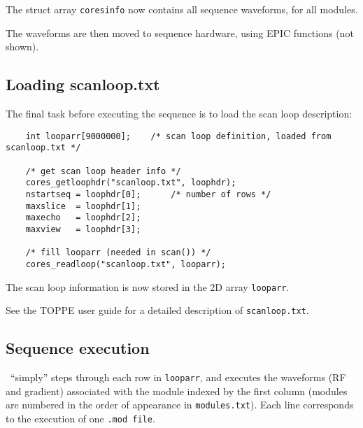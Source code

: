 The struct array {\tt coresinfo} now contains all sequence waveforms, for all modules.

The waveforms are then moved to sequence hardware, using EPIC functions (not shown).


\subsection{Loading scanloop.txt}

The final task before executing the sequence is to load the scan loop description:

\begin{lstlisting}
	int looparr[9000000];    /* scan loop definition, loaded from scanloop.txt */

	/* get scan loop header info */
	cores_getloophdr("scanloop.txt", loophdr);
	nstartseq = loophdr[0];      /* number of rows */
	maxslice  = loophdr[1];
	maxecho   = loophdr[2];
	maxview   = loophdr[3];

	/* fill looparr (needed in scan()) */
	cores_readloop("scanloop.txt", looparr);
\end{lstlisting}

The scan loop information is now stored in the 2D array {\tt looparr}.

See the TOPPE user guide for a detailed description of {\tt scanloop.txt}.


\subsection{Sequence execution}

\toppe~``simply'' steps through each row in {\tt looparr}, and executes the waveforms (RF and gradient) associated with the module indexed by the first column (modules are numbered in the order of appearance in {\tt modules.txt}).
Each line corresponds to the execution of one {\tt .mod file}. 



